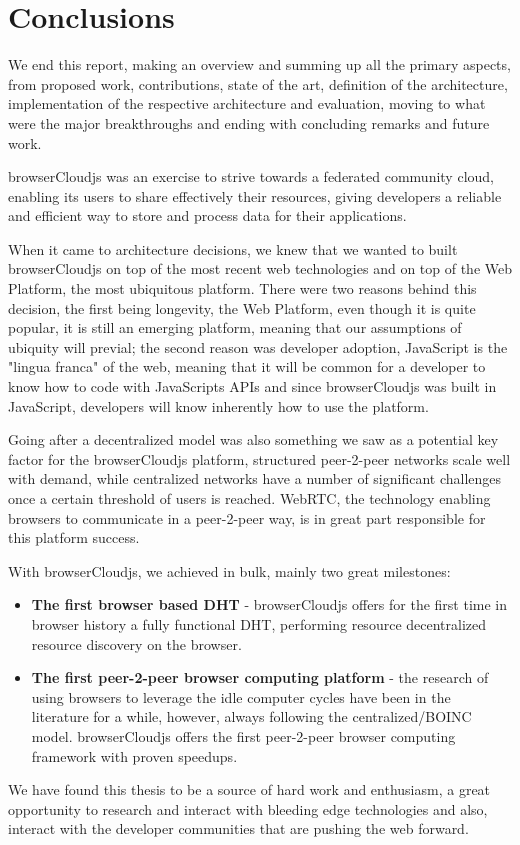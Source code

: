 
%
%

\section{Conclusions}

We end this report, making an overview and summing up all the primary aspects, from proposed work, contributions, state of the art, definition of the architecture, implementation of the respective architecture and evaluation, moving to what were the major breakthroughs and ending with concluding remarks and future work.

browserCloudjs was an exercise to strive towards a federated community cloud, enabling its users to share effectively their resources, giving developers a reliable and efficient way to store and process data for their applications.

When it came to architecture decisions, we knew that we wanted to built browserCloudjs on top of the most recent web technologies and on top of the Web Platform, the most ubiquitous platform. There were two reasons behind this decision, the first being longevity, the Web Platform, even though it is quite popular, it is still an emerging platform, meaning that our assumptions of ubiquity will previal; the second reason was developer adoption, JavaScript is the "lingua franca" of the web, meaning that it will be common for a developer to know how to code with JavaScripts APIs and since browserCloudjs was built in JavaScript, developers will know inherently how to use the platform.

Going after a decentralized model was also something we saw as a potential key factor for the browserCloudjs platform, structured peer-2-peer networks scale well with demand, while centralized networks have a number of significant challenges once a certain threshold of users is reached. WebRTC, the technology enabling browsers to communicate in a peer-2-peer way, is in great part responsible for this platform success.

With browserCloudjs, we achieved in bulk, mainly two great milestones:

\begin{itemize}
    \item \textbf{The first browser based DHT} - browserCloudjs offers for the first time in browser history a fully functional DHT, performing resource decentralized resource discovery on the browser. 
    \item \textbf{The first peer-2-peer browser computing platform} - the research of using browsers to leverage the idle computer cycles have been in the literature for a while, however, always following the centralized/BOINC model. browserCloudjs offers the first peer-2-peer browser computing framework with proven speedups.
\end{itemize}

We have found this thesis to be a source of hard work and enthusiasm, a great opportunity to research and interact with bleeding edge technologies and also, interact with the developer communities that are pushing the web forward.
